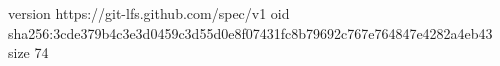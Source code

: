 version https://git-lfs.github.com/spec/v1
oid sha256:3cde379b4c3e3d0459c3d55d0e8f07431fc8b79692c767e764847e4282a4eb43
size 74

